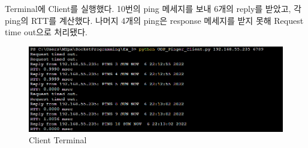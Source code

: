 Terminal에 Client를 실행했다. 10번의 ping 메세지를 보내 6개의 reply를 받았고, 각 ping의 RTT를 계산했다. 나머지 4개의 ping은 response 메세지를 받지 못해 Request time out으로 처리됐다. \\
\vspace{-4mm}
\begin{figure}[!h]\centering 
	\includegraphics[width=.99\textwidth]{image/week09/3-2.png}
	\caption{\footnotesize
	Client Terminal}
	\vspace{-10pt}
\end{figure}

\clearpage
